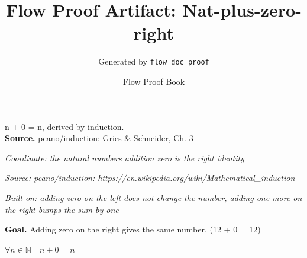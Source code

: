 \documentclass[11pt]{article}
\title{Flow Proof Artifact: Nat-plus-zero-right}
\author{Generated by \texttt{flow doc proof}}
\date{Flow Proof Book}
\theoremstyle{definition}
\begin{document}
\maketitle
n + 0 = n, derived by induction.\\[0.5em]
\textbf{Source.} peano/induction: Gries \& Schneider, Ch. 3\\[0.5em]
\bigskip
{}\par
\smallskip\noindent\textit{Coordinate: the natural numbers \cdot addition \cdot zero is the right identity}\par
\smallskip\noindent\textit{Source: peano/induction: https://en.wikipedia.org/wiki/Mathematical\_induction}\par
\smallskip\noindent\textit{Built on: adding zero on the left does not change the number, adding one more on the right bumps the sum by one}\par
\medskip
\noindent\textbf{Goal.} Adding zero on the right gives the same number.  (12 + 0 = 12)\par
\noindent$\displaystyle \forall n \in \mathbb{N}\quad n + 0 = n$\par
\medskip
\noindent
\end{document}

